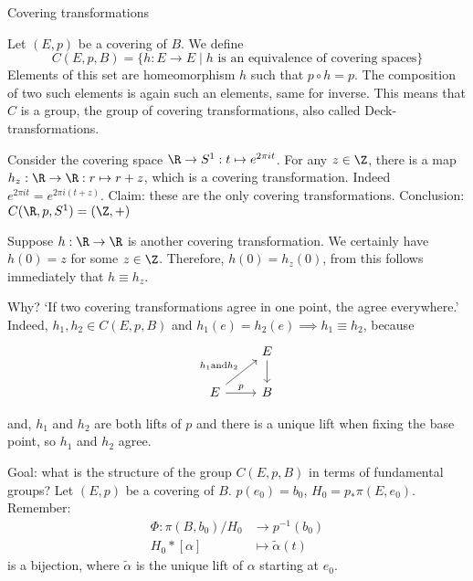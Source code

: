 \setcounter{section}{75}
Covering transformations

\begin{definition}
    Let $(E, p)$ be a covering of $B$.
    We define \[
        C(E, p, B) = \{ h: E \to  E  \mid  \text{$h$ is an equivalence of covering spaces}\}
    \]
    Elements of this set are homeomorphism $h$ such that $p  \circ  h = p$.
    The composition of two such elements is again such an elements, same for inverse.
    This means that $C$ is a group, the group of covering transformations, also called Deck-transformations.
\end{definition}

\begin{eg}
    Consider the covering space $\R \to  S^1: t \mapsto e^{ 2\pi i t}$.
    For any $z \in \Z$, there is a map $h_z: \R \to \R: r \mapsto r + z$, which is a covering transformation. Indeed $e^{2 \pi it} = e^{2 \pi i (t + z)}$.
    Claim: these are the only covering transformations.
    Conclusion: $C(\R, p, S^{1}) = (\Z, +)$
\end{eg}
\begin{explanation}
    Suppose $h: \R \to \R$ is another covering transformation.
    We certainly have $h(0) = z$ for some $z \in \Z$.
    Therefore, $h(0) = h_z(0)$, from this follows immediately that $ h \equiv h_z$.

    Why?  `If two covering transformations agree in one point, the agree everywhere.'
    Indeed, $h_1, h_2 \in C(E, p, B)$ and $h_1(e) = h_2(e) \implies h_1 \equiv h_2$, because 
    \[
        \begin{tikzcd}
            & E \arrow[d, ""]\\
            E \arrow[ur, "h_1 \text{and} h_2"]\arrow[r, "p"] & B
        \end{tikzcd}
    \]

    and, $h_1$ and $h_2$ are both lifts of $p$ and there is a unique lift when fixing the base point, so $h_1$ and $h_2$ agree.
\end{explanation}

Goal: what is the structure of the group $C(E, p, B)$ in terms of fundamental groups?
Let $(E, p)$ be a covering of $B$. $p(e_0) = b_0$, $H_0 = p_*\pi(E,e_0)$.
Remember:
\begin{align*}
    \Phi: \pi(B,b_0) / H_0 &\longrightarrow p^{-1}(b_0) \\
    H_0 * [\alpha] &\longmapsto \tilde{\alpha}(t)
\end{align*}
is a bijection, where $\tilde{\alpha}$ is the unique lift of $\alpha$ starting at $e_0$.

